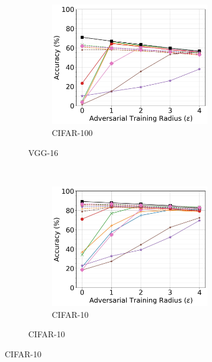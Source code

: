\documentclass[conference]{IEEEtran}
\theoremstyle{definition}
\theoremstyle{remark}
\theoremstyle{proposition}
\begin{document}
\begin{figure}[p!]
\begin{subfigure}{1.0\textwidth}
\begin{subfigure}{.3\textwidth}
		\centering
		\includegraphics[width=1.0\textwidth]{VGG-16_AT_CIFAR-100.jpg}
		\caption*{CIFAR-100}
		\label{fig:at_cifar100:vgg16}
	\end{subfigure}
    \caption{VGG-16}
	\label{fig:at_vgg16}
    \end{subfigure}\\\vspace*{0.5em}
    \begin{subfigure}{1.0\textwidth}
	\begin{subfigure}{.3\textwidth}
		\centering
		\includegraphics[width=1.0\textwidth]{DN-121_AT_CIFAR-10.jpg}
		\caption*{CIFAR-10}
		\label{fig:at_cifar10:dn121}
	\end{subfigure}\hspace*{0.75em}

\end{subfigure}
\end{figure}
\end{document}
